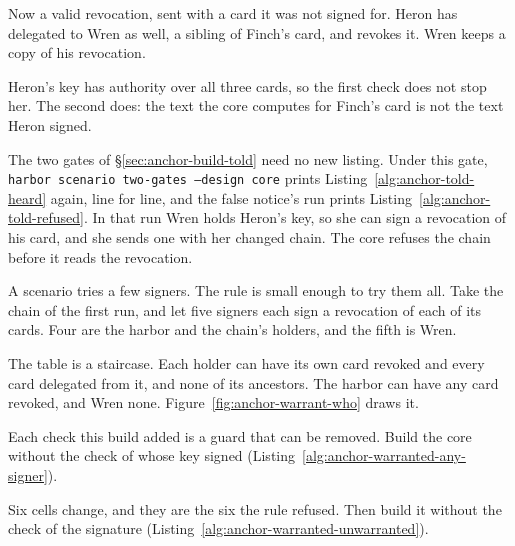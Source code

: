 Now a valid revocation, sent with a card it was not signed for. Heron has
delegated to Wren as well, a sibling of Finch's card, and revokes it. Wren
keeps a copy of his revocation.


Heron's key has authority over all three cards, so the first check does not
stop her. The second does: the text the core computes for Finch's card is
not the text Heron signed.

The two gates of \S\ref{sec:anchor-build-told} need no new listing. Under
this gate, \texttt{harbor scenario two-gates --design core} prints
Listing~\ref{alg:anchor-told-heard} again, line for line, and the
false notice's run prints Listing~\ref{alg:anchor-told-refused}. In that run
Wren holds Heron's key, so she can sign a revocation of his card, and she
sends one with her changed chain. The core refuses the chain before it
reads the revocation.

A scenario tries a few signers. The rule is small enough to try them all.
Take the chain of the first run, and let five signers each sign a
revocation of each of its cards. Four are the harbor and the chain's
holders, and the fifth is Wren.


The table is a staircase. Each holder can have its own card revoked and
every card delegated from it, and none of its ancestors. The harbor can have
any card revoked, and Wren none. Figure~\ref{fig:anchor-warrant-who} draws
it.



Each check this build added is a guard that can be removed. Build the
core without the check of whose key signed
(Listing~\ref{alg:anchor-warranted-any-signer}).


Six cells change, and they are the six the rule refused. Then build it
without the check of the signature
(Listing~\ref{alg:anchor-warranted-unwarranted}).

